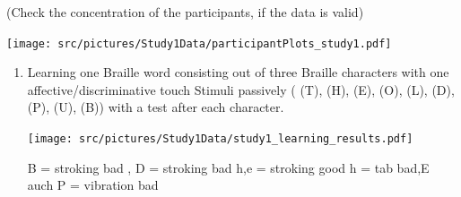 (Check the concentration of the participants, if the data is valid)

    \centering
    \texttt{[image: src/pictures/Study1Data/participantPlots\_study1.pdf]}



\begin{enumerate}
    \item Learning one Braille word consisting out of three Braille characters with one affective/discriminative touch Stimuli passively ( (T), (H), (E), (O), (L), (D),  (P),  (U), (B)) with a test after each character.
    
        \centering
        \texttt{[image: src/pictures/Study1Data/study1\_learning\_results.pdf]}

\begin{table}[ht]
\caption{Results of Kruskal-Wallis significance tests for the different Braille characters during learning with a $\eta^2$ Effect Size.}
\label{table:learning_significance_results_firstStudy_nonParam}
\end{table}
B = stroking bad
, D = stroking bad
h,e = stroking good
h = tab bad,E auch
P = vibration bad


\end{enumerate}
